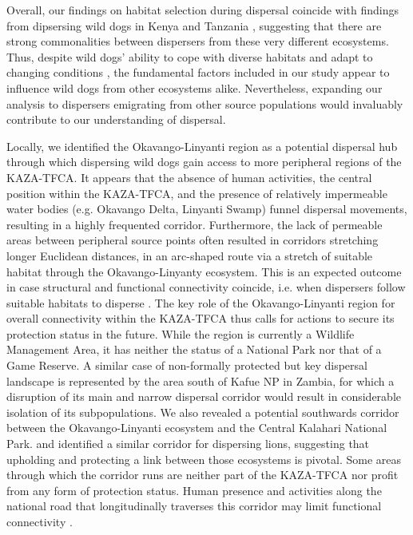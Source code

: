 \documentclass[abstract=on,10pt,a4paper,bibliography=totocnumbered]{article}
\begin{document}
Overall, our findings on habitat selection during dispersal coincide with
findings from dipsersing wild dogs in Kenya \citep{Oneill.2020} and Tanzania
\citep{Masenga.2016}, suggesting that there are strong commonalities between
dispersers from these very different ecosystems. Thus, despite wild dogs'
ability to cope with diverse habitats and adapt to changing conditions
\citep{Woodroffe.2011}, the fundamental factors included in our study appear to
influence wild dogs from other ecosystems alike. Nevertheless, expanding our
analysis to dispersers emigrating from other source populations would invaluably
contribute to our understanding of dispersal.

Locally, we identified the Okavango-Linyanti region as a potential dispersal hub
through which dispersing wild dogs gain access to more peripheral regions of the
KAZA-TFCA. It appears that the absence of human activities, the central position
within the KAZA-TFCA, and the presence of relatively impermeable water bodies
(e.g. Okavango Delta, Linyanti Swamp) funnel dispersal movements, resulting in a
highly frequented corridor. Furthermore, the lack of permeable areas between
peripheral source points often resulted in corridors stretching longer Euclidean
distances, in an arc-shaped route via a stretch of suitable habitat through the
Okavango-Linyanty ecosystem. This is an expected outcome in case structural and
functional connectivity coincide, i.e. when dispersers follow suitable habitats
to disperse \citep{Fattebert.2015, Hauenstein.2019}. The key role of the
Okavango-Linyanti region for overall connectivity within the KAZA-TFCA thus
calls for actions to secure its protection status in the future. While the
region is currently a Wildlife Management Area, it has neither the status of a
National Park nor that of a Game Reserve. A similar case of non-formally
protected but key dispersal landscape is represented by the area south of Kafue
NP in Zambia, for which a disruption of its main and narrow dispersal corridor
would result in considerable isolation of its subpopulations. We also revealed a
potential southwards corridor between the Okavango-Linyanti ecosystem and the
Central Kalahari National Park. \cite{Elliot.2014} and \cite{Cushman.2018}
identified a similar corridor for dispersing lions, suggesting that upholding
and protecting a link between those ecosystems is pivotal. Some areas through
which the corridor runs are neither part of the KAZA-TFCA nor profit from any
form of protection status. Human presence and activities along the national road
that longitudinally traverses this corridor may limit functional connectivity
\citep{Cozzi.2020}.
\end{document}
